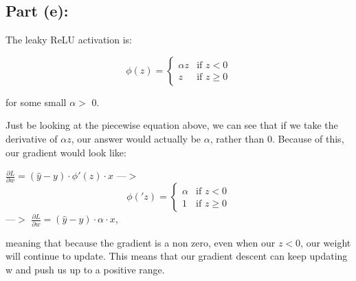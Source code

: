 \documentclass{article}
\begin{document}
\subsection*{Part (e):}

The leaky ReLU activation is:

\begin{equation}
\phi(z) = 
\begin{cases}
\alpha z & \text{if } z  < 0 \\
z & \text{if } z \ge 0
\end{cases}
\end{equation}

for some small $\alpha> $ 0.

Just be looking at the piecewise equation above, we can see that if we take the derivative of $\alpha z$, our answer would actually be $\alpha$, rather than 0. Because of this, our gradient would look like:

$\frac{\partial L}{\partial w} = (\hat{y} - y) \cdot \phi '(z) \cdot x$  ---$>$
\begin{equation}
\phi('z) = 
\begin{cases}
\alpha & \text{if } z  < 0 \\
1 & \text{if } z \ge 0
\end{cases}
\end{equation}
---$>$ $\frac{\partial L}{\partial w} = (\hat{y} - y) \cdot \alpha \cdot x$, 



meaning that because the gradient is a non zero, even when our $z < 0$, our weight will continue to update. This means that our gradient descent can keep updating w and push us up to a positive range. 
\end{document}
